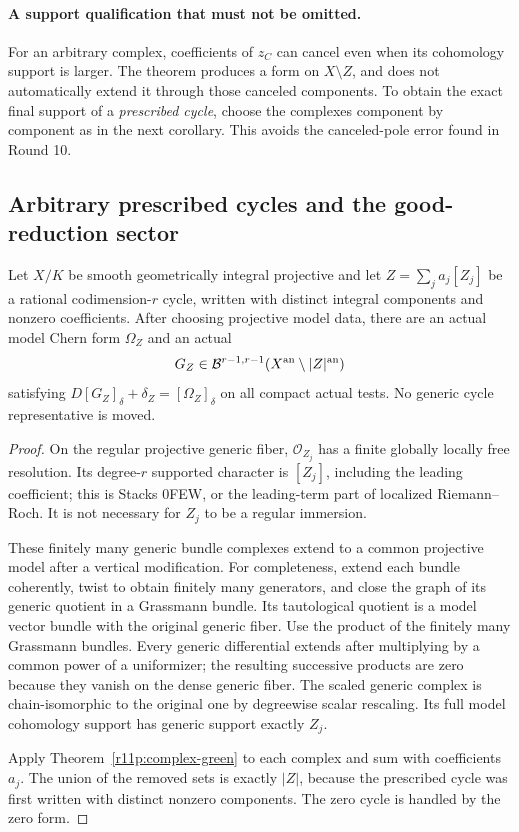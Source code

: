 \paragraph{A support qualification that must not be omitted.}
For an arbitrary complex, coefficients of $z_C$ can cancel even when
its cohomology support is larger.  The theorem produces a form on
$X\setminus Z$, and does not automatically extend it through those
canceled components.  To obtain the exact final support of a
\emph{prescribed cycle}, choose the complexes component by component
as in the next corollary.  This avoids the canceled-pole error found
in Round 10.

\subsection{Arbitrary prescribed cycles and the good-reduction sector}

\begin{corollary}
\label{r11p:any-cycle-pair}
Let $X/K$ be smooth geometrically integral projective and let
$Z=\sum_j a_j[Z_j]$ be a rational codimension-$r$ cycle, written with
distinct integral components and nonzero coefficients.  After choosing
projective model data, there are an actual model Chern form $\Omega_Z$
and an actual
\[
                  G_Z\in\mathcal B^{r-1,r-1}
                           (X^{\rm an}\setminus|Z|^{\rm an})
\]
satisfying $D[G_Z]_\delta+\delta_Z=[\Omega_Z]_\delta$ on all compact
actual tests.  No generic cycle representative is moved.
\end{corollary}

\begin{proof}
On the regular projective generic fiber, $\mathcal O_{Z_j}$ has a
finite globally locally free resolution.  Its degree-$r$ supported
character is $[Z_j]$, including the leading coefficient; this is
Stacks 0FEW, or the leading-term part of localized Riemann--Roch.
It is not necessary for $Z_j$ to be a regular immersion.

These finitely many generic bundle complexes extend to a common
projective model after a vertical modification.  For completeness,
extend each bundle coherently, twist to obtain finitely many generators,
and close the graph of its generic quotient in a Grassmann bundle.
Its tautological quotient is a model vector bundle with the original
generic fiber.  Use the product of the finitely many Grassmann bundles.
Every generic differential extends after multiplying by a common
power of a uniformizer; the resulting successive products are zero
because they vanish on the dense generic fiber.  The scaled generic
complex is chain-isomorphic to the original one by degreewise scalar
rescaling.  Its full model cohomology support has generic support
exactly $Z_j$.

Apply Theorem~\ref{r11p:complex-green} to each complex and sum with
coefficients $a_j$.  The union of the removed sets is exactly
$|Z|$, because the prescribed cycle was first written with distinct
nonzero components.  The zero cycle is handled by the zero form.
\end{proof}

